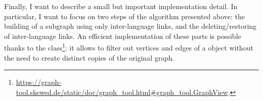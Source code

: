                 Finally, I want to describe a small but important implementation detail. In particular, I want to focus on two steps of the algorithm presented above: the building of a subgraph using only inter-language links, and the deleting/restoring of inter-language links. An efficient implementation of these parts is possible thanks to the  class\footnote{\url{https://graph-tool.skewed.de/static/doc/graph_tool.html\#graph_tool.GraphView}.}: it allows to filter out vertices and edges of a  object without the need to create distinct copies of the original graph.
